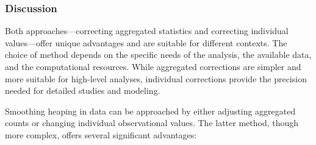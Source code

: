 \documentclass[12pt]{article}
\theoremstyle{plain}
\theoremstyle{definition}
\begin{document}
\subsubsection{Discussion}

Both approaches---correcting aggregated statistics and correcting individual values---offer unique advantages and are suitable for different contexts. The choice of method depends on the specific needs of the analysis, the available data, and the computational resources. While aggregated corrections are simpler and more suitable for high-level analyses, individual corrections provide the precision needed for detailed studies and modeling.

Smoothing heaping in data can be approached by either adjusting aggregated counts or changing individual observational values. The latter method, though more complex, offers several significant advantages:
\end{document}
